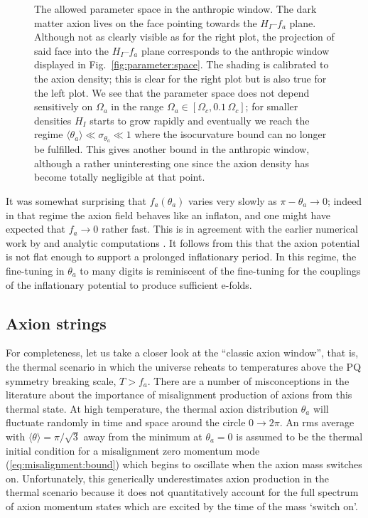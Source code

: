 \documentclass[preprint,nofootinbib]{revtex4}
\newcommand{\reffig}[1]{Fig.~\ref{#1}}
\begin{document}
\begin{figure}[tbp]
\begin{center}
\caption{The allowed parameter space in the anthropic window. The dark matter axion lives on the face pointing towards the $H_I$--$f_a$ plane. Although not as clearly visible as for the right plot, the projection of said face into the $H_I$--$f_a$ plane corresponds to the anthropic window displayed in \reffig{fig:parameter:space}. The shading is calibrated to the axion density; this is clear for the right plot but is also true for the left plot. We see that the parameter space does not depend sensitively on $\Omega_a$ in the range $\Omega_a \in [\Omega_c,0.1\,\Omega_c]$; for smaller densities $H_I$ starts to grow rapidly and eventually we reach the regime $\langle \theta_a \rangle \ll \sigma_{\theta_a} \ll 1$ where the isocurvature bound can no longer be fulfilled. This gives another bound in the anthropic window, although a rather uninteresting one since the axion density has become totally negligible at that point.}
\label{fig:anthropic:3d}
\end{center}
\end{figure}

It was somewhat surprising that $f_a(\theta_a)$ varies very slowly as $\pi-\theta_a \to 0$; indeed in that regime the axion field behaves like an inflaton, and one might have expected that $f_a \to 0$ rather fast. This is in agreement with the earlier numerical work by \cite{turner:axion:cosmology} and analytic computations \cite{lyth:axion:inflation:fluctuations:1,strobl:weiler:axion:anharmonic,visinelli:gondolo:axion}. It follows from this that the axion potential is not flat enough to support a prolonged inflationary period. In this regime, the fine-tuning in $\theta_a$ to many digits is reminiscent of the fine-tuning for the couplings of the inflationary potential to produce sufficient e-folds.

\subsection{Axion strings}

For completeness, let us take a closer look at the ``classic axion window'', that is, the thermal scenario in which the universe reheats to temperatures above the PQ symmetry breaking scale, $T > f_a$.  There are a number of misconceptions in the literature about the importance of misalignment production of axions from this thermal state.  At high temperature, the thermal axion distribution $\theta_a$ will fluctuate randomly in time and space around the circle $0 \rightarrow 2\pi$. An rms average with $\langle \theta \rangle= \pi/\sqrt{3}$ away from the minimum at $\theta_a=0$ is assumed to be the thermal initial condition for a misalignment zero momentum mode (\ref{eq:misalignment:bound}) which begins to oscillate when the axion mass switches on. Unfortunately, this generically underestimates axion production in the thermal scenario because it does not quantitatively account for the full spectrum of axion momentum states which are excited by the time of the mass `switch on'.
\end{document}
